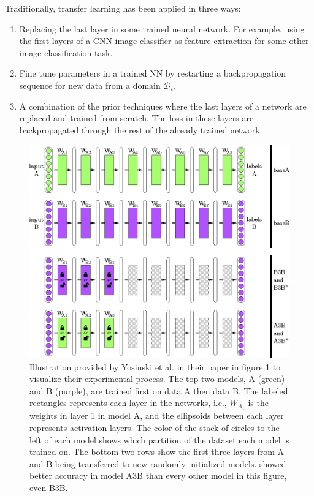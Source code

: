 Traditionally, transfer learning has been applied in three ways: 
\begin{enumerate}  
    \item Replacing the last layer in some trained neural network. For example, using the first layers of a CNN image classifier as feature extraction for some other image classification task. 
    \item Fine tune parameters in a trained NN by restarting a backpropagation sequence for new data from a domain \(\mathcal{D}_{t}\).
    \item A combination of the prior techniques where the last layers of a network are replaced and trained from scratch. The loss in these layers are backpropagated through the rest of the already trained network.
\end{enumerate}


\begin{figure}[ht] 
    \centering
    \includegraphics[width=\linewidth]{Chapters/2.Background/figures/transfer_experiment.png}
    \caption[Transfer learning experiment]{Illustration provided by Yosinski et al. in their paper\cite{yosinski2014transferable} in figure 1 to visualize their experimental process. The top two models, A (green) and B (purple), are trained first on data A then data B. The labeled rectangles represents each layer in the networks, i.e., \(W_{A_{1}}\) is the weights in layer 1 in model A, and the ellipsoids between each layer represents activation layers. The color of the stack of circles to the left of each model shows which partition of the dataset each model is trained on. The bottom two rows show the first three layers from A and B being transferred to new randomly initialized models. \cite{yosinski2014transferable} showed better accuracy in model A3B than every other model in this figure, even B3B.}
    \label{fig:transferexperiment}
\end{figure}

